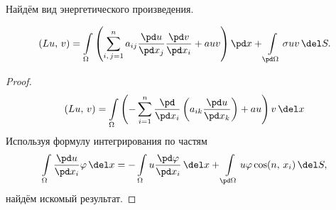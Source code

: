 \documentclass{trlnotes}
\begin{document}
    Найдём вид энергетического произведения.

    \begin{st}
        \[
            (Lu, \, v) = \int\limits_{\Omega} \left(\sum\limits_{i, \, j = 1}^n a_{ij} \dfrac{\pd u}{\pd x_j} \dfrac{\pd v}{\pd x_i} + auv\right) \pd x + \int\limits_{\pd \Omega} \sigma u v \, \del S.
        \]
        \begin{proof}
            \[
                (Lu, \, v) = \int\limits_{\Omega}  \left( - \sum\limits_{i = 1}^n \dfrac{\pd}{\pd x_i}\left(a_{ik} \dfrac{\pd u}{\pd x_k}\right) + au \right) v \, \del x
            \]
            Используя формулу интегрирования по частям
            \[
                \int\limits_{\Omega} \dfrac{\pd u}{\pd x_i} \varphi \, \del x = - \int\limits_{\Omega} u  \dfrac{\pd \varphi}{\pd x_i} \, \del x + \int\limits_{\pd \Omega} u\varphi \cos(n, \, x_i) \, \del S,
            \]
            найдём искомый результат.
        \end{proof}
    \end{st}
\end{document}
